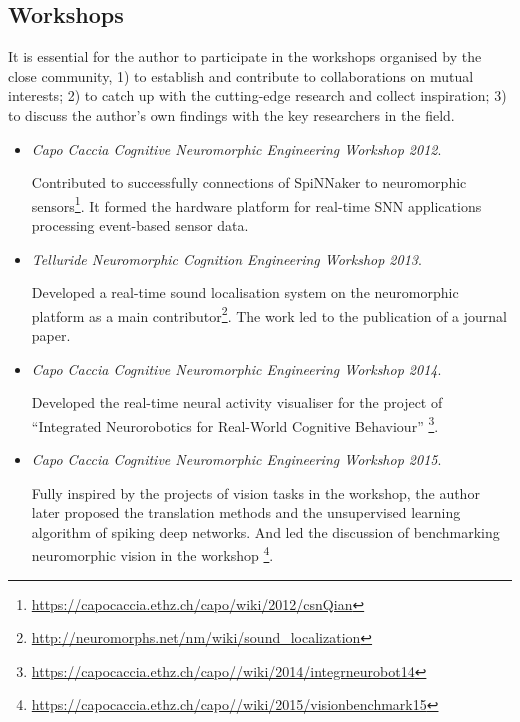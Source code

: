 \subsection{Workshops}
It is essential for the author to participate in the workshops organised by the close community, 1) to establish and contribute to collaborations on mutual interests; 2) to catch up with the cutting-edge research and collect inspiration; 3) to discuss the author's own findings with the key researchers in the field.
\begin{itemize}
	\item 
	\textit{Capo Caccia Cognitive Neuromorphic Engineering Workshop 2012}.
	
	Contributed to successfully connections of SpiNNaker to neuromorphic sensors\footnote{\url{https://capocaccia.ethz.ch/capo/wiki/2012/csnQian}}. 
	It formed the hardware platform for real-time SNN applications processing event-based sensor data.
	
	\item 
	\textit{Telluride Neuromorphic Cognition Engineering Workshop 2013}.
	
	Developed a real-time sound localisation system on the neuromorphic platform as a main contributor\footnote{\url{http://neuromorphs.net/nm/wiki/sound_localization}}.
	The work led to the publication of a journal paper\cite{lagorce2015breaking}.
	
	
	\item 
	\textit{Capo Caccia Cognitive Neuromorphic Engineering Workshop 2014}.
	
	Developed the real-time neural activity visualiser for the project of ``Integrated Neurorobotics for Real-World Cognitive Behaviour'' \footnote{\url{https://capocaccia.ethz.ch/capo//wiki/2014/integrneurobot14}}. 
	
	\item 
	\textit{Capo Caccia Cognitive Neuromorphic Engineering Workshop 2015}.
	
	Fully inspired by the projects of vision tasks in the workshop, the author later proposed the translation methods and the unsupervised learning algorithm of spiking deep networks.
	And led the discussion of benchmarking neuromorphic vision in the workshop \footnote{\url{https://capocaccia.ethz.ch/capo//wiki/2015/visionbenchmark15}}. 	
\end{itemize}




